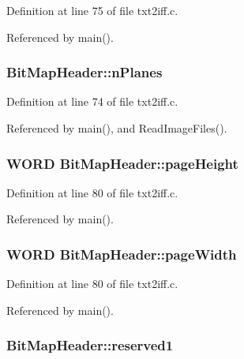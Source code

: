 Definition at line 75 of file txt2iff.\+c.



Referenced by main().

\hypertarget{structBitMapHeader_af1b1ea355b635d40198d9d97989bc733}{
\subsubsection[{n\+Planes}]{ Bit\+Map\+Header\+::n\+Planes}}\label{structBitMapHeader_af1b1ea355b635d40198d9d97989bc733}


Definition at line 74 of file txt2iff.\+c.



Referenced by main(), and Read\+Image\+Files().

\hypertarget{structBitMapHeader_a8bdbcc13d038ad9ec4903cbda9787322}{
\subsubsection[{page\+Height}]{\setlength{\rightskip}{0pt plus 5cm}W\+O\+R\+D Bit\+Map\+Header\+::page\+Height}}\label{structBitMapHeader_a8bdbcc13d038ad9ec4903cbda9787322}


Definition at line 80 of file txt2iff.\+c.



Referenced by main().

\hypertarget{structBitMapHeader_a0f8da84e2be2bc315960071931dcaebe}{
\subsubsection[{page\+Width}]{\setlength{\rightskip}{0pt plus 5cm}W\+O\+R\+D Bit\+Map\+Header\+::page\+Width}}\label{structBitMapHeader_a0f8da84e2be2bc315960071931dcaebe}


Definition at line 80 of file txt2iff.\+c.



Referenced by main().

\hypertarget{structBitMapHeader_af0d7f0f49e119ffbe3d4691c186702f2}{
\subsubsection[{reserved1}]{ Bit\+Map\+Header\+::reserved1}}\label{structBitMapHeader_af0d7f0f49e119ffbe3d4691c186702f2}


